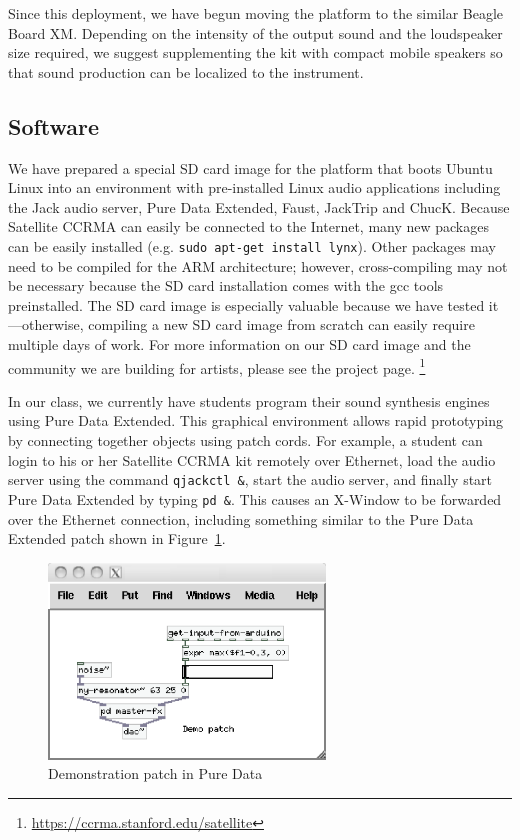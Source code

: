 Since this deployment, we have begun moving the platform to the similar Beagle Board XM. Depending on the intensity of the output sound and the loudspeaker size required, we suggest supplementing the kit with compact mobile speakers so that sound production can be localized to the instrument.


\subsection{Software}
We have prepared a special SD card image for the platform that boots Ubuntu Linux into an environment with pre-installed Linux audio applications including the Jack audio server, Pure Data Extended, Faust, JackTrip and ChucK.  Because Satellite CCRMA can easily be connected to the Internet, many new packages can be easily installed (e.g. \texttt{sudo apt-get install lynx}).  Other packages may need to be compiled for the ARM architecture; however, cross-compiling may not be necessary because the SD card installation comes with the gcc tools preinstalled.  The SD card image is especially valuable because we have tested it---otherwise, compiling a new SD card image from scratch can easily require multiple days of work.  For more information on our SD card image and the community we are building for artists, please see the project page. \footnote{\url{https://ccrma.stanford.edu/satellite}}

In our class, we currently have students program their sound synthesis engines using Pure Data Extended.  This graphical environment allows rapid prototyping by connecting together objects using patch cords.  For example, a student can login to his or her Satellite CCRMA kit remotely over Ethernet, load the audio server using the command \texttt{qjackctl \&}, start the audio server, and finally start Pure Data Extended by typing \texttt{pd \&}.  This causes an X-Window to be forwarded over the Ethernet connection, including something similar to the Pure Data Extended patch shown in Figure~\ref{Berdahl:fig:PdPatch}.

\begin{figure}[t]
	\centering
		\includegraphics[width=2.9in]{Photos/Demo-Patch.eps}
	\caption{Demonstration patch in Pure Data}
	\label{Berdahl:fig:PdPatch}
\end{figure}

